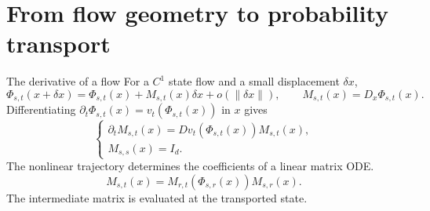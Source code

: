 \section[Geometry and transport]{From flow geometry to probability transport}

\begin{frame}[t]{The derivative of a flow}
\hypertarget{main:variational}{}
For a $C^1$ state flow and a small displacement $\delta x$,
\begin{equation*}
  \Phi_{s,t}(x+\delta x)=\Phi_{s,t}(x)+M_{s,t}(x)\delta x+o(\|\delta x\|),
  \qquad M_{s,t}(x)=D_x\Phi_{s,t}(x).
\end{equation*}
Differentiating $\partial_t\Phi_{s,t}(x)=v_t(\Phi_{s,t}(x))$ in $x$ gives
\begin{equation*}
  \begin{cases}
    \partial_t M_{s,t}(x)=Dv_t(\Phi_{s,t}(x))M_{s,t}(x),\\
    M_{s,s}(x)=I_d.
  \end{cases}
\end{equation*}
The nonlinear trajectory determines the coefficients of a linear matrix ODE.
\begin{equation*}
  M_{s,t}(x)=M_{r,t}(\Phi_{s,r}(x))M_{s,r}(x).
\end{equation*}
The intermediate matrix is evaluated at the transported state.
\end{frame}

